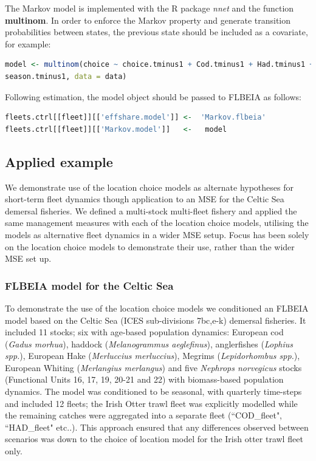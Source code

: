 \documentclass[12pt, halfline, a4paper]{ouparticle}
\begin{document}
The Markov model is implemented with the R package \textit{nnet} and the
function \textbf{multinom}. In order to enforce the Markov property and
generate transition probabilities between states, the previous state should be
included as a covariate, for example:

\begin{lstlisting}[language=R]
model <- multinom(choice ~ choice.tminus1 + Cod.tminus1 + Had.tminus1 +
season.tminus1, data = data)
\end{lstlisting}

Following estimation, the model object should be passed to FLBEIA as follows:

\begin{lstlisting}[language=R]
fleets.ctrl[[fleet]][['effshare.model']] <-  'Markov.flbeia'
fleets.ctrl[[fleet]][['Markov.model']]   <-   model 
\end{lstlisting}

\subsection{Applied example}

We demonstrate use of the location choice models as alternate hypotheses for
short-term fleet dynamics though application to an MSE for the Celtic Sea
demersal fisheries. We defined a multi-stock multi-fleet fishery and applied
the same management measures with each of the location choice models, utilising
the models as alternative fleet dynamics in a wider MSE setup. Focus has been
solely on the location choice models to demonstrate their use, rather than the
wider MSE set up.

\subsubsection{FLBEIA model for the Celtic Sea}

To demonstrate the use of the location choice models we conditioned an FLBEIA
model based on the Celtic Sea (ICES sub-divisions 7bc,e-k) demersal fisheries.
It included 11 stocks; six with age-based population dynamics: European cod
(\textit{Gadus morhua}), haddock (\textit{Melanogrammus aeglefinus}),
anglerfishes (\textit{Lophius spp.}), European Hake (\textit{Merluccius
	merluccius}), Megrims (\textit{Lepidorhombus spp.}), European Whiting
(\textit{Merlangius merlangus}) and five \textit{Nephrops norvegicus} stocks
(Functional Units 16, 17, 19, 20-21 and 22) with biomass-based population
dynamics. The model was conditioned to be seasonal, with quarterly time-steps
and included 12 fleets; the Irish Otter trawl fleet was explicitly modelled
while the remaining catches were aggregated into a separate fleet
(``COD\_fleet", ``HAD\_fleet" etc..). This approach ensured that any
differences observed between scenarios was down to the choice of location model
for the Irish otter trawl fleet only. \\
\end{document}
